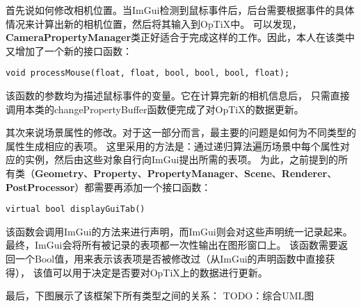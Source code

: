 首先说如何修改相机位置。当ImGui检测到鼠标事件后，后台需要根据事件的具体情况来计算出新的相机位置，然后将其输入到OpTiX中。
可以发现，\textbf{CameraPropertyManager}类正好适合于完成这样的工作。因此，本人在该类中又增加了一个新的接口函数：

\lstset{language=C++}
\begin{lstlisting}
void processMouse(float, float, bool, bool, bool, float);
\end{lstlisting}

该函数的参数均为描述鼠标事件的变量。它在计算完新的相机信息后，
只需直接调用本类的changePropertyBuffer函数便完成了对OpTiX的数据更新。

其次来说场景属性的修改。对于这一部分而言，最主要的问题是如何为不同类型的属性生成相应的表项。
这里采用的方法是：通过递归算法遍历场景中每个属性对应的实例，然后由这些对象自行向ImGui提出所需的表项。
为此，之前提到的所有类（\textbf{Geometry}、\textbf{Property}、\textbf{PropertyManager}、\textbf{Scene}、\textbf{Renderer}、\textbf{PostProcessor}）都需要再添加一个接口函数：
\lstset{language=C++}
\begin{lstlisting}
virtual bool displayGuiTab() 
\end{lstlisting}

该函数会调用ImGui的方法来进行声明，而ImGui则会对这些声明统一记录起来。
最终，ImGui会将所有被记录的表项都一次性输出在图形窗口上。
该函数需要返回一个Bool值，用来表示该表项是否被修改过（从ImGui的声明函数中直接获得），
该值可以用于决定是否要对OpTiX上的数据进行更新。

最后，下图展示了该框架下所有类型之间的关系：
TODO：综合UML图